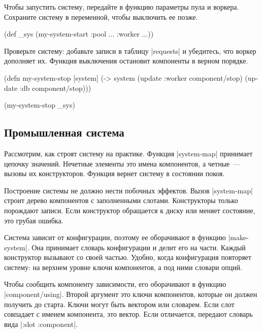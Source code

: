 Чтобы запустить систему, передайте в функцию параметры пула и воркера. Сохраните
систему в переменной, чтобы выключить ее позже.

\begin{english}
  \begin{clojure}
(def _sys (my-system-start {:pool {...} :worker {...}}))
  \end{clojure}
\end{english}

Проверьте систему: добавьте записи в таблицу \spverb|requests| и убедитесь, что
воркер дополняет их. Функция выключения остановит компоненты в верном порядке.

\begin{english}
  \begin{clojure}
(defn my-system-stop
  [system]
  (-> system
      (update :worker component/stop)
      (update :db component/stop)))

(my-system-stop _sys)
  \end{clojure}
\end{english}

\subsection{Промышленная система}

Рассмотрим, как строят систему на практике. Функция \spverb|system-map|
принимает цепочку значений. Нечетные элементы это имена компонентов, а
четные~--- вызовы их конструкторов. Функция вернет систему в состоянии покоя.

Построение системы не должно нести побочных эффектов. Вызов \spverb|system-map|
строит дерево компонентов с заполненными слотами. Конструкторы только порождают
записи. Если конструктор обращается к диску или меняет состояние, это грубая
ошибка.

Система зависит от конфигурации, поэтому ее оборачивают в функцию
\spverb|make-system|. Она принимает словарь конфигурации и делит его на
части. Каждый конструктор вызывают со своей частью. Удобно, когда конфигурация
повторяет систему: на верхнем уровне ключи компонентов, а под ними словари
опций.

Чтобы сообщить компоненту зависимости, его оборачивают в функцию
\spverb|component/using|. Второй аргумент это ключи компонентов, которые он
должен получить до старта. Ключи могут быть вектором или словарем. Если слот
совпадает с именем компонента, это вектор. Если отличается, передают словарь
вида \spverb|{:slot :component}|.


